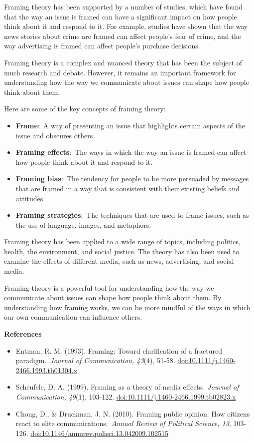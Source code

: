 \documentclass[
  b5paper]{book}
\begin{document}
Framing theory has been supported by a number of studies, which have found that the way an issue is framed can have a significant impact on how people think about it and respond to it. For example, studies have shown that the way news stories about crime are framed can affect people's fear of crime, and the way advertising is framed can affect people's purchase decisions.

Framing theory is a complex and nuanced theory that has been the subject of much research and debate. However, it remains an important framework for understanding how the way we communicate about issues can shape how people think about them.

Here are some of the key concepts of framing theory:

\begin{itemize}
\item
  \textbf{Frame}:~A way of presenting an issue that highlights certain aspects of the issue and obscures others.
\item
  \textbf{Framing effects}:~The ways in which the way an issue is framed can affect how people think about it and respond to it.
\item
  \textbf{Framing bias}:~The tendency for people to be more persuaded by messages that are framed in a way that is consistent with their existing beliefs and attitudes.
\item
  \textbf{Framing strategies}:~The techniques that are used to frame issues, such as the use of language, images, and metaphors.
\end{itemize}

Framing theory has been applied to a wide range of topics, including politics, health, the environment, and social justice. The theory has also been used to examine the effects of different media, such as news, advertising, and social media.

Framing theory is a powerful tool for understanding how the way we communicate about issues can shape how people think about them. By understanding how framing works, we can be more mindful of the ways in which our own communication can influence others.

\textbf{References}

\begin{itemize}
\item
  Entman, R. M. (1993). Framing: Toward clarification of a fractured paradigm.~\emph{Journal of Communication, 43}(4), 51-58. \url{doi:10.1111/j.1460-2466.1993.tb01304.x}
\item
  Scheufele, D. A. (1999). Framing as a theory of media effects.~\emph{Journal of Communication, 49}(1), 103-122. \url{doi:10.1111/j.1460-2466.1999.tb02823.x}
\item
  Chong, D., \& Druckman, J. N. (2010). Framing public opinion: How citizens react to elite communications.~\emph{Annual Review of Political Science, 13}, 103-126. \url{doi:10.1146/annurev.polisci.13.042009.102515}
\end{itemize}
\end{document}
